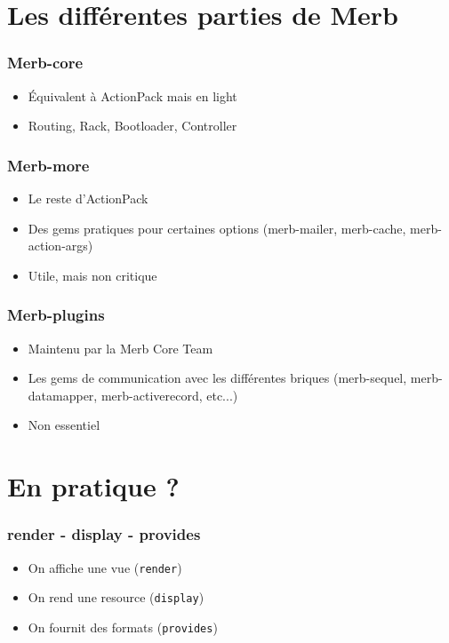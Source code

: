 \documentclass{beamer}
\begin{document}
\section{Les différentes parties de Merb}

\begin{frame}
    \frametitle{Merb-core}
    \begin{itemize}
        \item Équivalent à ActionPack mais en light
        \item Routing, Rack, Bootloader, Controller
    \end{itemize}
\end{frame}

\begin{frame}
    \frametitle{Merb-more}
    \begin{itemize}
        \item Le reste d'ActionPack
        \item Des gems pratiques pour certaines options (merb-mailer,
                merb-cache, merb-action-args)
        \item Utile, mais non critique
    \end{itemize}
\end{frame}

\begin{frame}
    \frametitle{Merb-plugins}
    \begin{itemize}
        \item Maintenu par la Merb Core Team
        \item Les gems de communication avec les différentes briques
        (merb-sequel, merb-datamapper, merb-activerecord, etc...)
        \item Non essentiel
    \end{itemize}
\end{frame}

\section{En pratique ?}

\begin{frame}
    \frametitle{render - display - provides}
    \begin{itemize}
        \item On affiche une vue (\texttt{render})
        \item On rend une resource (\texttt{display})
        \item On fournit des formats (\texttt{provides})
    \end{itemize}
\end{frame}
\end{document}
